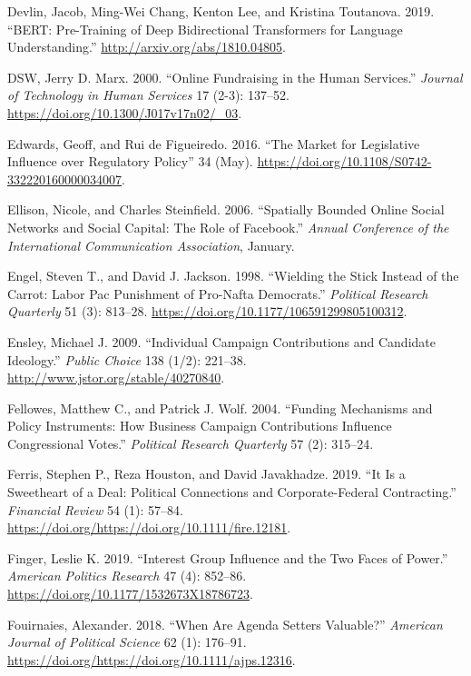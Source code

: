 \documentclass[12pt,]{article}
\begin{document}
\leavevmode\hypertarget{ref-bert}{}%
Devlin, Jacob, Ming-Wei Chang, Kenton Lee, and Kristina Toutanova. 2019.
``BERT: Pre-Training of Deep Bidirectional Transformers for Language
Understanding.'' \url{http://arxiv.org/abs/1810.04805}.

\leavevmode\hypertarget{ref-marx2000}{}%
DSW, Jerry D. Marx. 2000. ``Online Fundraising in the Human Services.''
\emph{Journal of Technology in Human Services} 17 (2-3): 137--52.
\url{https://doi.org/10.1300/J017v17n02/_03}.

\leavevmode\hypertarget{ref-edwards2016}{}%
Edwards, Geoff, and Rui de Figueiredo. 2016. ``The Market for
Legislative Influence over Regulatory Policy'' 34 (May).
\url{https://doi.org/10.1108/S0742-332220160000034007}.

\leavevmode\hypertarget{ref-ellison2006}{}%
Ellison, Nicole, and Charles Steinfield. 2006. ``Spatially Bounded
Online Social Networks and Social Capital: The Role of Facebook.''
\emph{Annual Conference of the International Communication Association},
January.

\leavevmode\hypertarget{ref-engel1998}{}%
Engel, Steven T., and David J. Jackson. 1998. ``Wielding the Stick
Instead of the Carrot: Labor Pac Punishment of Pro-Nafta Democrats.''
\emph{Political Research Quarterly} 51 (3): 813--28.
\url{https://doi.org/10.1177/106591299805100312}.

\leavevmode\hypertarget{ref-ensley2009}{}%
Ensley, Michael J. 2009. ``Individual Campaign Contributions and
Candidate Ideology.'' \emph{Public Choice} 138 (1/2): 221--38.
\url{http://www.jstor.org/stable/40270840}.

\leavevmode\hypertarget{ref-fellowes2004}{}%
Fellowes, Matthew C., and Patrick J. Wolf. 2004. ``Funding Mechanisms
and Policy Instruments: How Business Campaign Contributions Influence
Congressional Votes.'' \emph{Political Research Quarterly} 57 (2):
315--24.

\leavevmode\hypertarget{ref-ferris2019}{}%
Ferris, Stephen P., Reza Houston, and David Javakhadze. 2019. ``It Is a
Sweetheart of a Deal: Political Connections and Corporate-Federal
Contracting.'' \emph{Financial Review} 54 (1): 57--84.
\url{https://doi.org/https://doi.org/10.1111/fire.12181}.

\leavevmode\hypertarget{ref-finger2019}{}%
Finger, Leslie K. 2019. ``Interest Group Influence and the Two Faces of
Power.'' \emph{American Politics Research} 47 (4): 852--86.
\url{https://doi.org/10.1177/1532673X18786723}.

\leavevmode\hypertarget{ref-fouirnaies2018}{}%
Fouirnaies, Alexander. 2018. ``When Are Agenda Setters Valuable?''
\emph{American Journal of Political Science} 62 (1): 176--91.
\url{https://doi.org/https://doi.org/10.1111/ajps.12316}.
\end{document}
